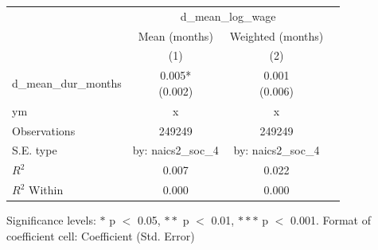 \renewcommand\cellalign{t}
\begin{threeparttable}
\begin{tabular}{lccc}
\toprule
 & \multicolumn{2}{c}{d_mean_log_wage} \\
\cmidrule(lr){2-3} 
 & Mean (months) & Weighted (months) \\
 & (1) & (2) \\
\midrule
\addlinespace
d_mean_dur_months & \makecell{0.005* \\ (0.002)} & \makecell{0.001 \\ (0.006)} \\
\midrule
\addlinespace
ym & x & x \\
\midrule
\addlinespace
Observations & 249249 & 249249 \\
S.E. type & by: naics2_soc_4 & by: naics2_soc_4 \\
$R^2$ & 0.007 & 0.022 \\
$R^2$ Within & 0.000 & 0.000 \\
\bottomrule
\end{tabular}
\footnotesize Significance levels: $*$ p $<$ 0.05, $**$ p $<$ 0.01, $***$ p $<$ 0.001. Format of coefficient cell: Coefficient 
 (Std. Error)
\end{threeparttable}